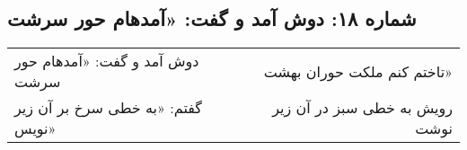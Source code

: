 \begin{center}
\section*{شماره ۱۸: دوش آمد و گفت: «آمدهام حور سرشت}
\label{sec:018}
\begin{longtable}{l p{0.5cm} r}
دوش آمد و گفت: «آمدهام حور سرشت
&&
تاختم کنم ملکت حوران بهشت»
\\
گفتم: «به خطی سرخ بر آن زیر نویس»
&&
رویش به خطی سبز در آن زیر نوشت
\\
\end{longtable}
\end{center}

